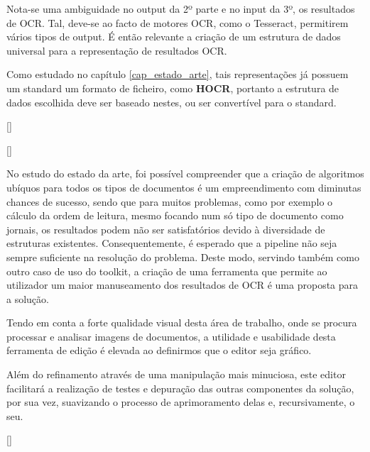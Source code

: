 Nota-se uma ambiguidade no output da 2º parte e no input da 3º, os resultados de OCR. Tal, deve-se ao facto de motores OCR, como o Tesseract, permitirem vários tipos de output. É então relevante a criação de um estrutura de dados universal para a representação de resultados OCR.

Como estudado no capítulo \ref{cap_estado_arte}, tais representações já possuem um standard um formato de ficheiro, como \textbf{HOCR}, portanto a estrutura de dados escolhida deve ser baseado nestes, ou ser convertível para o standard.


[\normalsize]

[\normalsize]


No estudo do estado da arte, foi possível compreender que a criação de algoritmos ubíquos para todos os tipos de documentos é um empreendimento com diminutas chances de sucesso, sendo que para muitos problemas, como por exemplo o cálculo da ordem de leitura, mesmo focando num só tipo de documento como jornais, os resultados podem não ser satisfatórios devido à diversidade de estruturas existentes. Consequentemente, é esperado que a pipeline não seja sempre suficiente na resolução do problema. 
Deste modo, servindo também como outro caso de uso do toolkit, a criação de uma ferramenta que permite ao utilizador um maior manuseamento dos resultados de OCR é uma proposta para a solução. 

Tendo em conta a forte qualidade visual desta área de trabalho, onde se procura processar e analisar imagens de documentos, a utilidade e usabilidade desta ferramenta de edição é elevada ao definirmos que o editor seja gráfico.

Além do refinamento através de uma manipulação mais minuciosa, este editor facilitará a realização de testes e depuração das outras componentes da solução, por sua vez, suavizando o processo de aprimoramento delas e, recursivamente, o seu.


[\normalsize]



